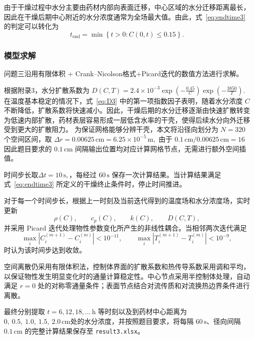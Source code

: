 \documentclass[12pt,a4paper]{article}
\begin{document}
由于干燥过程中水分主要由药材内部向表面迁移，中心区域的水分迁移距离最长，因此在干燥后期中心附近的水分浓度通常为全场最大值。由此，式~\eqref{eq:endtime3} 的判定可以转化为
\begin{equation}
t_{\mathrm{end}}
=
\min
\left\{
t>0:
C(0,t)
\leq 0.15
\right\}.
\label{eq:endtime4}
\end{equation}


\subsubsection{模型求解}

问题三沿用有限体积 + Crank--Nicolson格式+Picard迭代的数值方法进行求解。

根据附录3，水分扩散系数为
$D(C,T)=2.4\times10^{-3}
\exp\left(-\frac{0.45}{C}\right)
\exp\left(-\frac{3850}{T}\right).
\label{eq:D3}$
在温度基本稳定的情况下，式~\eqref{eq:D3} 中的第一项指数因子表明，随着水分浓度 $C$ 不断降低，扩散系数将快速减小。因此，干燥后期的水分迁移逐渐由快速扩散转变为低速内部扩散，药材表层容易形成一层低含水率的干壳，使得后续水分向外迁移受到更大的扩散阻力。
为保证网格能够分辨干壳，本文将沿径向划分为 $N=320$ 个空间区间，取
$\Delta r
=
0.00625\,\mathrm{cm}
=
6.25\times10^{-5}\,\mathrm{m},$
由于
$
0.1\,\mathrm{cm}/0.00625\,\mathrm{cm}=16
$
因此题目要求的 $0.1\,\mathrm{cm}$ 间隔输出位置均对应计算网格节点，无需进行额外空间插值。

时间步长取$\Delta t=10\,\mathrm{s},$，每经过 $60\,\mathrm{s}$ 保存一次计算结果。当计算结果满足式~\eqref{eq:endtime3} 所定义的干燥终止条件时，停止时间推进。

对于每一个时间步长，根据上一时刻及当前迭代得到的温度场和水分浓度场，实时更新
$$
\rho(C),\qquad
c_p(C),\qquad
k(C),\qquad
D(C,T),
$$
并采用 Picard 迭代处理物性参数变化所产生的非线性耦合。当相邻两次迭代满足
\begin{equation}
\max_i\left|C_i^{(m+1)}-C_i^{(m)}\right|
<10^{-11},
\qquad
\max_i\left|T_i^{(m+1)}-T_i^{(m)}\right|
<10^{-9},
\end{equation}
时认为该时间步达到收敛。

空间离散仍采用有限体积法，控制体界面的扩散系数和热传导系数采用调和平均，以保证物性发生明显变化时的通量计算稳定性。中心节点采用半控制体处理，自动满足 $r=0$ 处的对称零通量条件；表面节点结合对流传质和对流换热边界条件进行离散。

最终分别提取 $t=6,12,18,\ldots\,\mathrm{h}$ 等时刻以及到药材中心距离为$0,\ 0.5,\ 1.0,\ 1.5,\ 2.0\,\mathrm{cm}$处的水分浓度，并按照题目要求，将每隔 $60\,\mathrm{s}$、径向间隔 $0.1\,\mathrm{cm}$ 的完整计算结果保存至 \texttt{result3.xlsx}。
\end{document}

